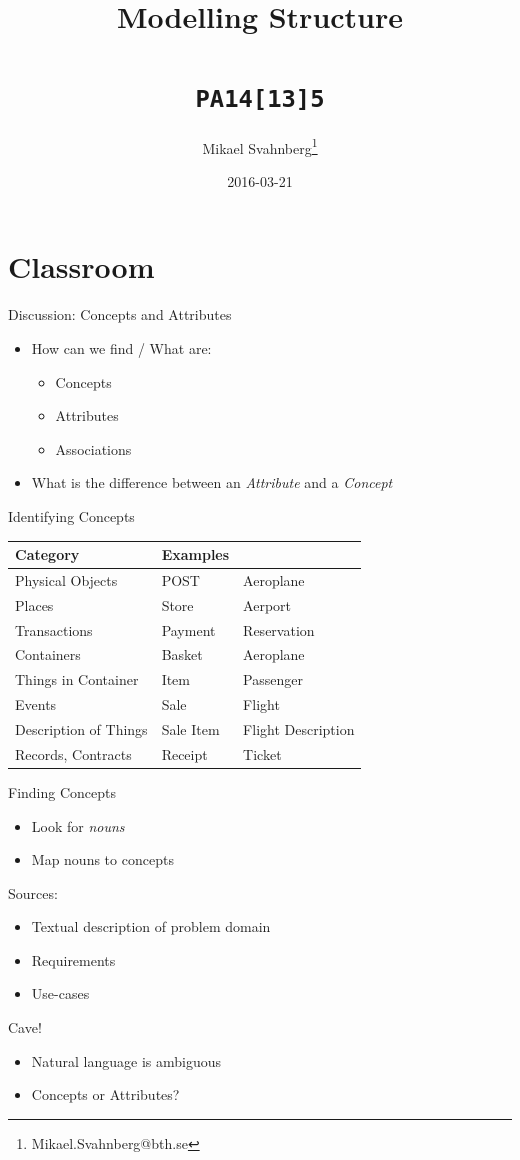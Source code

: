 \documentclass[10pt,t,a4paper]{beamer}
\author{Mikael Svahnberg\thanks{Mikael.Svahnberg@bth.se}}
\date{2016-03-21}
\title{Modelling Structure \\\\ \texttt{PA14[13]5}}
\begin{document}
\maketitle

\section{Classroom}
\label{sec-1}
\begin{frame}[label=sec-1-1]{Discussion: Concepts and Attributes}
\begin{itemize}
\item How can we find / What are:
\begin{itemize}
\item Concepts
\item Attributes
\item Associations
\end{itemize}
\item What is the difference between an \emph{Attribute} and a \emph{Concept}
\end{itemize}
\end{frame}
\begin{frame}[label=sec-1-2]{Identifying Concepts}
\begin{center}
\begin{tabular}{lll}
Category & Examples & \\
\hline
Physical Objects & POST & Aeroplane\\
Places & Store & Aerport\\
Transactions & Payment & Reservation\\
Containers & Basket & Aeroplane\\
Things in Container & Item & Passenger\\
Events & Sale & Flight\\
Description of Things & Sale Item & Flight Description\\
Records, Contracts & Receipt & Ticket\\
\hline
\end{tabular}
\end{center}
\end{frame}
\begin{frame}[label=sec-1-3]{Finding Concepts}
\begin{itemize}
\item Look for \emph{nouns}
\item Map nouns to concepts
\end{itemize}

Sources:     
\begin{itemize}
\item Textual description of problem domain
\item Requirements
\item Use-cases
\end{itemize}

Cave!
\begin{itemize}
\item Natural language is ambiguous
\item Concepts or Attributes?
\end{itemize}
\end{frame}
\end{document}
